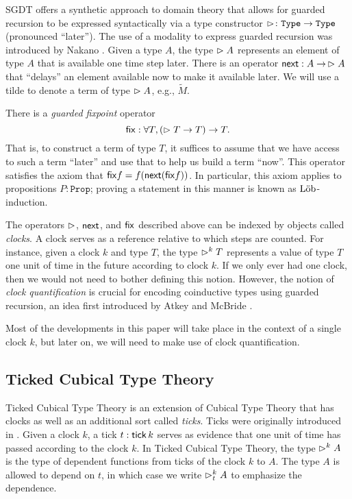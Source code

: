 SGDT offers a synthetic approach to domain theory that allows for guarded recursion
to be expressed syntactically via a type constructor $\vartriangleright \colon \texttt{Type} \to \texttt{Type}$ 
(pronounced ``later''). The use of a modality to express guarded recursion
was introduced by Nakano \cite{Nakano2000}.
%
Given a type $A$, the type $\vartriangleright A$ represents an element of type $A$
that is available one time step later. There is an operator $\mathsf{next} : A \to\, \vartriangleright A$
that ``delays'' an element available now to make it available later.
We will use a tilde to denote a term of type $\vartriangleright A$, e.g., $\tilde{M}$.


There is a \emph{guarded fixpoint} operator
%
\[
  \mathsf{fix} : \forall T, (\vartriangleright T \to T) \to T.
\]
%
That is, to construct a term of type $T$, it suffices to assume that we have access to
such a term ``later'' and use that to help us build a term ``now''.
This operator satisfies the axiom that $\mathsf{fix} f = f (\mathsf{next} (\mathsf{fix} f))$.
In particular, this axiom applies to propositions $P : \texttt{Prop}$; proving
a statement in this manner is known as $\text{L\"{o}b}$-induction.

The operators $\vartriangleright$, $\mathsf{next}$, and $\mathsf{fix}$ described above can be indexed by objects
called \emph{clocks}. A clock serves as a reference relative to which steps are counted.
For instance, given a clock $k$ and type $T$, the type $\vartriangleright^k T$ represents a value of type
$T$ one unit of time in the future according to clock $k$.
If we only ever had one clock, then we would not need to bother defining this notion.
However, the notion of \emph{clock quantification} is crucial for encoding coinductive types using guarded
recursion, an idea first introduced by Atkey and McBride \cite{atkey-mcbride2013}.

Most of the developments in this paper will take place in the context of a single clock $k$,
but later on, we will need to make use of clock quantification.

\subsection{Ticked Cubical Type Theory}

Ticked Cubical Type Theory \cite{mogelberg-veltri2019} is an extension of
Cubical Type Theory \cite{CohenCoquandHuberMortberg2017} that has clocks as well
as an additional sort called \emph{ticks}. Ticks were originally introduced in
\cite{bahr-grathwohl-bugge-mogelberg2017}. Given a clock $k$, a tick $t :
\mathsf{tick}\, k$ serves as evidence that one unit of time has passed according to the
clock $k$. In Ticked Cubical Type Theory, the type $\vartriangleright^k A$ is the type of
dependent functions from ticks of the clock $k$ to $A$. The type $A$ is allowed
to depend on $t$, in which case we write $\vartriangleright^k_t A$ to emphasize the
dependence.

